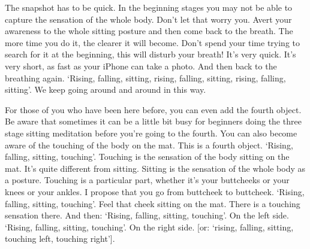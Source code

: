 \documentclass[letterpaper,10pt,english]{sphinxmanual}
\begin{document}
\sphinxAtStartPar
The snapshot has to be quick. In the beginning stages you may not be
able  to  capture  the  sensation  of  the  whole  body.  Don’t  let  that  worry  you.
  Avert your awareness to the whole sitting posture and then come back to the
breath. The more time you do it, the clearer it will become. Don’t spend your
time trying to search for it at the beginning, this will disturb your breath! It’s
very quick. It’s very short, as fast as your iPhone can take a photo. And then
back to the breathing again. ‘Rising, falling, sitting, rising, falling, sitting,
rising, falling, sitting’. We keep going around and around in this way.

\sphinxAtStartPar
For  those  of  you  who  have  been  here  before,  you  can  even  add  the
fourth object. Be aware that sometimes it can be a little bit busy for beginners doing the three stage sitting meditation before you’re going to the fourth.
You can also become aware of the touching of the body on the mat. This is
a  fourth  object.  ‘Rising,  falling,  sitting,  touching’.  Touching  is  the  sensation of the body sitting on the mat. It’s quite different from sitting. Sitting is
the sensation of the whole body as a posture. Touching is a particular part,
whether it’s your butt\sphinxhyphen{}cheeks or your knees or your ankles. I propose that
you  go  from  butt\sphinxhyphen{}cheek  to  butt\sphinxhyphen{}cheek.  ‘Rising,  falling,  sitting,  touching’.
Feel that cheek sitting on the mat. There is a touching sensation there. And
then: ‘Rising, falling, sitting, touching’. On the left side. ‘Rising, falling, sitting, touching’. On the right side. {[}or: ‘rising, falling, sitting, touching left,
touching right’{]}.
\end{document}
